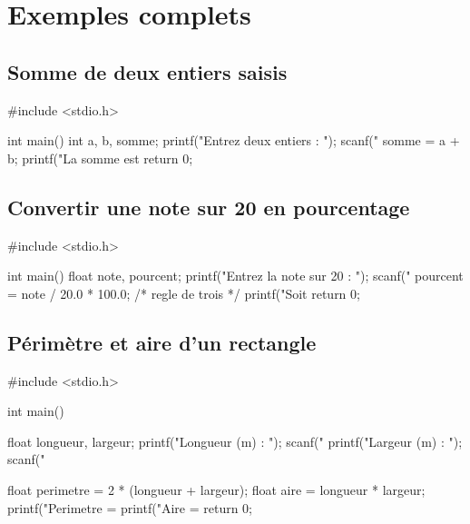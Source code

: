 
\section{Exemples complets}

\subsection{Somme de deux entiers saisis}

\begin{codec}
#include <stdio.h>

int main()
{
    int a, b, somme;
    printf("Entrez deux entiers : ");
    scanf("%
    somme = a + b;
    printf("La somme est %
    return 0;
}
\end{codec}


\subsection{Convertir une note sur 20 en pourcentage}

\begin{codec}
#include <stdio.h>

int main()
{
    float note, pourcent;
    printf("Entrez la note sur 20 : ");
    scanf("%
    pourcent = note / 20.0 * 100.0;   /* regle de trois */
    printf("Soit %
    return 0;
}
\end{codec}


\subsection{Périmètre et aire d'un rectangle}

\begin{codec}
#include <stdio.h>

int main()
{
    float longueur, largeur;
    printf("Longueur (m) : ");
    scanf("%
    printf("Largeur (m) : ");
    scanf("%

    float perimetre = 2 * (longueur + largeur);
    float aire = longueur * largeur;
    printf("Perimetre = %
    printf("Aire = %
    return 0;
}
\end{codec}

